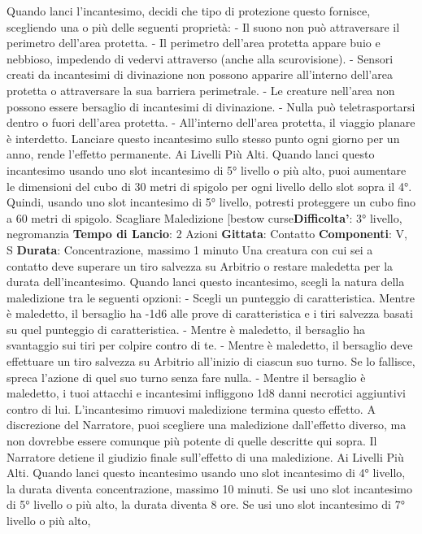 \begin{multicols}{2}
Quando lanci l’incantesimo, decidi che tipo di
protezione questo fornisce, scegliendo una o più delle
seguenti proprietà:
- Il suono non può attraversare il perimetro dell’area
protetta.
- Il perimetro dell’area protetta appare buio e
nebbioso, impedendo di vedervi attraverso (anche
alla scurovisione).
- Sensori creati da incantesimi di divinazione non
possono apparire all’interno dell’area protetta o
attraversare la sua barriera perimetrale.
- Le creature nell’area non possono essere bersaglio
di incantesimi di divinazione.
- Nulla può teletrasportarsi dentro o fuori dell’area
protetta.
- All’interno dell’area protetta, il viaggio planare è
interdetto.
Lanciare questo incantesimo sullo stesso punto ogni
giorno per un anno, rende l’effetto permanente.
Ai Livelli Più Alti. Quando lanci questo incantesimo
usando uno slot incantesimo di 5° livello o più alto, puoi
aumentare le dimensioni del cubo di 30 metri di spigolo
per ogni livello dello slot sopra il 4°. Quindi, usando uno
slot incantesimo di 5° livello, potresti proteggere un
cubo fino a 60 metri di spigolo.
Scagliare Maledizione
[bestow curse\textbf{Difficolta'}:
3° livello, negromanzia
\textbf{Tempo di Lancio}: 2 Azioni
\textbf{Gittata}: Contatto
\textbf{Componenti}: V, S
\textbf{Durata}: Concentrazione, massimo 1 minuto
Una creatura con cui sei a contatto deve superare un
tiro salvezza su Arbitrio o restare maledetta per la
durata dell’incantesimo. Quando lanci questo
incantesimo, scegli la natura della maledizione tra le
seguenti opzioni:
- Scegli un punteggio di caratteristica. Mentre è
maledetto, il bersaglio ha -1d6 alle prove di
caratteristica e i tiri salvezza basati su quel
punteggio di caratteristica.
- Mentre è maledetto, il bersaglio ha svantaggio sui
tiri per colpire contro di te.
- Mentre è maledetto, il bersaglio deve effettuare un
tiro salvezza su Arbitrio all’inizio di ciascun suo
turno. Se lo fallisce, spreca l’azione di quel suo
turno senza fare nulla.
- Mentre il bersaglio è maledetto, i tuoi attacchi e
incantesimi infliggono 1d8 danni necrotici aggiuntivi
contro di lui.
L’incantesimo rimuovi maledizione termina questo
effetto. A discrezione del Narratore, puoi scegliere una
maledizione dall’effetto diverso, ma non dovrebbe
essere comunque più potente di quelle descritte qui
sopra. Il Narratore detiene il giudizio finale sull’effetto di una
maledizione.
Ai Livelli Più Alti. Quando lanci questo incantesimo
usando uno slot incantesimo di 4° livello, la durata
diventa concentrazione, massimo 10 minuti. Se usi uno
slot incantesimo di 5° livello o più alto, la durata diventa
8 ore. Se usi uno slot incantesimo di 7° livello o più alto,

\end{multicols}
